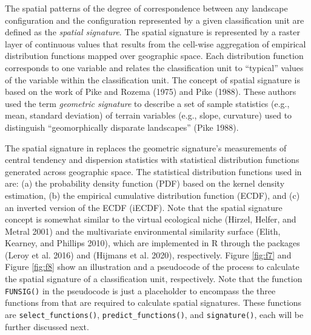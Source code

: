 The spatial patterns of the degree of correspondence between any landscape
configuration and the configuration represented by a given classification unit
are defined as the \emph{spatial signature}. The spatial signature is represented by
a raster layer of continuous values that results from the cell-wise aggregation
of empirical distribution functions mapped over geographic space. Each
distribution function corresponds to one variable and relates the classification
unit to ``typical'' values of the variable within the classification unit. The
concept of spatial signature is based on the work of Pike and Rozema (1975) and Pike (1988).
These authors used the term \emph{geometric signature} to describe a set of sample
statistics (e.g., mean, standard deviation) of terrain variables (e.g., slope,
curvature) used to distinguish ``geomorphically disparate landscapes''
(Pike 1988).

The spatial signature in  replaces the geometric signature's
measurements of central tendency and dispersion statistics with statistical
distribution functions generated across geographic space. The statistical
distribution functions used in  are: (a) the probability density
function (PDF) based on the kernel density estimation, (b) the empirical
cumulative distribution function (ECDF), and (c) an inverted version of the ECDF
(iECDF). Note that the spatial signature concept is somewhat similar to the
virtual ecological niche (Hirzel, Helfer, and Metral 2001) and the multivariate environmental
similarity surface (Elith, Kearney, and Phillips 2010), which are implemented in R through the packages
 (Leroy et al. 2016) and  (Hijmans et al. 2020),
respectively. Figure \ref{fig:f7} and Figure \ref{fig:f8} show an illustration
and a pseudocode of the process to calculate the spatial signature of a
classification unit, respectively. Note that the function \texttt{FUNSIG()} in the
pseudocode is just a placeholder to encompass the three functions from
 that are required to calculate spatial signatures. These functions
are \texttt{select\_functions()}, \texttt{predict\_functions()}, and \texttt{signature()}, each will be
further discussed next.

